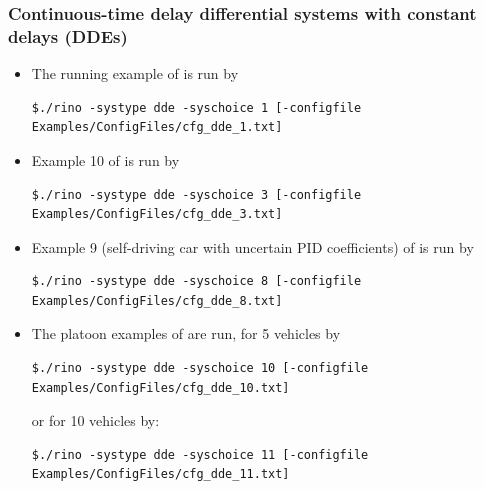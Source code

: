\documentclass{article}
\begin{document}
\subsubsection{Continuous-time delay differential systems with constant delays (DDEs)}
\begin{itemize}[noitemsep]
\item  The running example of \cite{cav18} is run  by 
\begin{verbatim}
$./rino -systype dde -syschoice 1 [-configfile Examples/ConfigFiles/cfg_dde_1.txt]
\end{verbatim}
\item  Example 10 of \cite{cav18} is run  by 
\begin{verbatim}
$./rino -systype dde -syschoice 3 [-configfile Examples/ConfigFiles/cfg_dde_3.txt]
\end{verbatim}
\item  Example 9 (self-driving car with uncertain PID coefficients) of \cite{cav18} is run  by 
\begin{verbatim}
$./rino -systype dde -syschoice 8 [-configfile Examples/ConfigFiles/cfg_dde_8.txt]
\end{verbatim}
\item  The platoon examples of \cite{cav18} are run, for 5 vehicles by 
\begin{verbatim}
$./rino -systype dde -syschoice 10 [-configfile Examples/ConfigFiles/cfg_dde_10.txt]
\end{verbatim}
or for 10 vehicles by: 
\begin{verbatim}
$./rino -systype dde -syschoice 11 [-configfile Examples/ConfigFiles/cfg_dde_11.txt]
\end{verbatim}
 \end{itemize}
\end{document}
